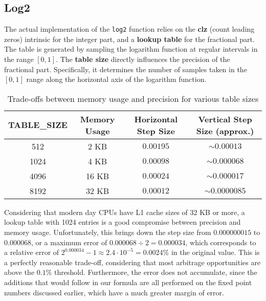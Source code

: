 \documentclass[11pt]{article}
\begin{document}
\subsection{Log2}
The actual implementation of the \texttt{log2} function relies on the \textbf{clz} (count leading zeros) intrinsic for the integer part, and a \textbf{lookup table} for the fractional part. The table is generated by sampling the logarithm function at regular intervals in the range $[0, 1]$.
The \textbf{table size} directly influences the precision of the fractional part. Specifically, it determines the number of samples taken in the $[0, 1]$ range along the horizontal axis of the logarithm function.
\begin{table}[h]
\centering
\begin{tabular}{|c|c|c|c|}
\hline
\textbf{TABLE\_SIZE} & \textbf{Memory Usage} & \textbf{Horizontal Step Size} & \textbf{Vertical Step Size (approx.)} \\
\hline
512     & 2 KB    & $0.00195$   & $\sim0.00013$ \\
1024    & 4 KB    & $0.00098$   & $\sim0.000068$ \\
4096    & 16 KB   & $0.00024$   & $\sim0.000017$ \\
8192    & 32 KB   & $0.00012$   & $\sim0.0000085$ \\
\hline
\end{tabular}
\caption{Trade-offs between memory usage and precision for various table sizes}
\end{table}
Considering that modern day CPUs have L1 cache sizes of 32 KB or more, a lookup table with 1024 entries is a good compromise between precision and memory usage. Unfortunately, this brings down the step size from $0.000000015$ to $0.000068$, or a maximum error of $0.000068 \div 2 = 0.000034$, which corresponds to a relative error of $2^{0.000034} - 1 \approx 2.4 \cdot 10^{-5} = 0.0024\%$ in the original value. This is a perfectly reasonable trade-off, considering that most arbitrage opportunities are above the $0.1\%$ threshold. Furthermore, the error does not accumulate, since the additions that would follow in our formula are all performed on the fixed point numbers discussed earlier, which have a much greater margin of error.
\end{document}
